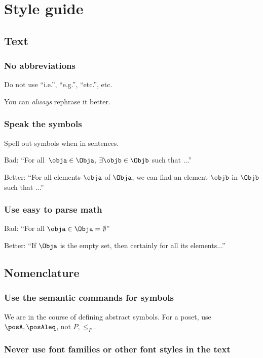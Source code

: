 \section*{Style guide}
\subsection*{Text}
\subsubsection*{No abbreviations}
Do not use ``i.e.'', ``e.g.'', ``etc.'', etc.

You can \emph{always} rephrase it better.

\subsubsection*{Speak the symbols}
Spell out symbols when in sentences.

Bad: ``For all~$\obja\in \Obja$, $\exists \objb \in \Objb$ such that ...''

Better: ``For all elements $\obja$ of $\Obja$, we can find an element $\objb$ in $\Objb$ such that ...''

\subsubsection*{Use easy to parse math}

Bad: ``For all $\obja\in \Obja=\emptyset$''

Better: ``If $\Obja$ is the empty set, then certainly for all its elements...''

\subsection*{Nomenclature}

\subsubsection*{Use the semantic commands for symbols}

We are in the course of defining abstract symbols.
For a poset, use $\posA,\posAleq$, not $P,\leq_P$.


\subsubsection*{Never use font families or other font styles in the text}


